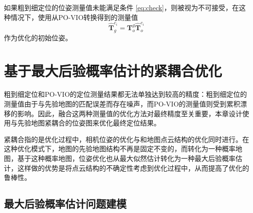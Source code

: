 如果粗到细定位的位姿测量值未能满足条件 \eqref{eq:check}，则被视为不可接受，在这种情况下，使用从PO-VIO转换得到的测量值
\begin{equation}
    \hat{\symbf{T}}_{g}^{c_i} = \symbf{T}_{o}^g \hat{\symbf{T}}_{o}^{c_i}
\end{equation}
作为优化的初始位姿。

\section{基于最大后验概率估计的紧耦合优化}
\label{sec:tight_opt}

粗到细定位和PO-VIO的定位测量结果都无法单独达到较高的精度：粗到细定位的测量值由于与先验地图的匹配误差而存在噪声，而PO-VIO的测量值则受到累积漂移的影响。因此，融合这两种测量值的优化方法对最终精度至关重要，本章设计使用与先验地图紧耦合的位姿图来优化最终定位结果。

紧耦合指的是优化过程中，相机位姿的优化与和地图点云结构的优化同时进行。在这种优化模式下，地图的先验地图结构不再是固定不变的，而转化为一种概率地图，基于这种概率地图，位姿优化也从最大似然估计转化为一种最大后验概率估计，这样做的优势是将点云结构的不确定性考虑到优化过程中，从而提高了优化的鲁棒性。

\subsection{最大后验概率估计问题建模}

